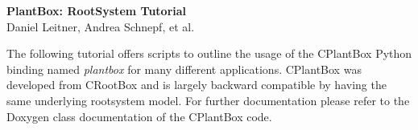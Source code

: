 \documentclass[a4paper]{article}
\begin{document}
\begin{center}
\vspace{0.5 cm}
\huge{\textbf{PlantBox: RootSystem Tutorial}} \\
\vspace{0.5 cm}
\normalsize
Daniel Leitner, Andrea Schnepf, et al. \\
\end{center}

\vspace{0.5 cm}

\noindent 
The following tutorial offers scripts to outline the usage of the CPlantBox \citep{zhou2020cplantbox} Python binding named \emph{plantbox} for many different applications. CPlantBox was developed from CRootBox \citep{schnepf2018crootbox} and is largely backward compatible by having the same underlying rootsystem model. For further documentation please refer to the Doxygen class documentation of the CPlantBox code.
 

\vspace{0.5 cm}

\tableofcontents

\newpage







 













\newpage

 
\end{document}
